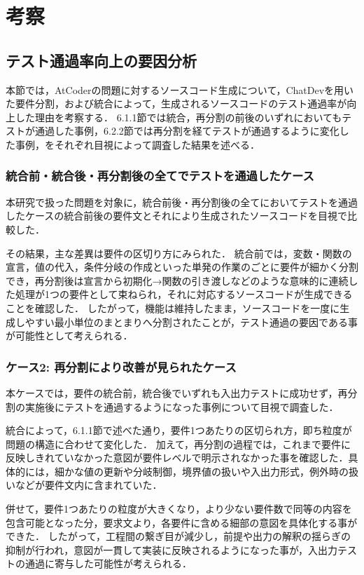 \documentclass[submit,techrep,noauthor]{ipsj}
\begin{document}
\section{考察}
\label{sec:discussion}
\subsection{テスト通過率向上の要因分析}
本節では，AtCoderの問題に対するソースコード生成について，ChatDevを用いた要件分割，および統合によって，生成されるソースコードのテスト通過率が向上した理由を考察する．
6.1.1節では統合，再分割の前後のいずれにおいてもテストが通過した事例，6.2.2節では再分割を経てテストが通過するように変化した事例，をそれぞれ目視によって調査した結果を述べる．

\subsubsection{統合前・統合後・再分割後の全てでテストを通過したケース}
本研究で扱った問題を対象に，統合前後・再分割後の全てにおいてテストを通過したケースの統合前後の要件文とそれにより生成されたソースコードを目視で比較した．

その結果，主な差異は要件の区切り方にみられた．
統合前では，変数・関数の宣言，値の代入，条件分岐の作成といった単発の作業のごとに要件が細かく分割でき，再分割後は宣言から初期化→関数の引き渡しなどのような意味的に連続した処理が1つの要件として束ねられ，それに対応するソースコードが生成できることを確認した．
したがって，機能は維持したまま，ソースコードを一度に生成しやすい最小単位のまとまりへ分割されたことが，テスト通過の要因である事が可能性として考えられる．

\subsubsection{ケース2: 再分割により改善が見られたケース}
本ケースでは，要件の統合前，統合後でいずれも入出力テストに成功せず，再分割の実施後にテストを通過するようになった事例について目視で調査した．

統合によって，6.1.1節で述べた通り，要件1つあたりの区切られ方，即ち粒度が問題の構造に合わせて変化した．
加えて，再分割の過程では，これまで要件に反映しきれていなかった意図が要件レベルで明示されなかった事を確認した．具体的には，細かな値の更新や分岐制御，境界値の扱いや入出力形式，例外時の扱いなどが要件文内に含まれていた．

併せて，要件1つあたりの粒度が大きくなり，より少ない要件数で同等の内容を包含可能となった分，要求文より，各要件に含める細部の意図を具体化する事ができた．
したがって，工程間の繋ぎ目が減少し，前提や出力の解釈の揺らぎの抑制が行われ，意図が一貫して実装に反映されるようになった事が，入出力テストの通過に寄与した可能性が考えられる．
\end{document}
